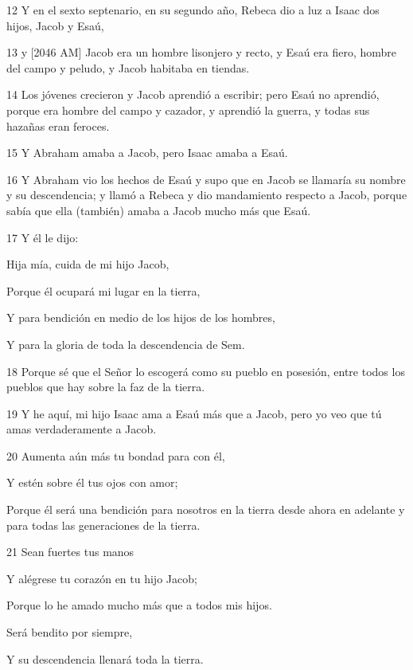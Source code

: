 \par 12 Y en el sexto septenario, en su segundo año, Rebeca dio a luz a Isaac dos hijos, Jacob y Esaú,
\par 13 y [2046 AM] Jacob era un hombre lisonjero y recto, y Esaú era fiero, hombre del campo y peludo, y Jacob habitaba en tiendas.
\par 14 Los jóvenes crecieron y Jacob aprendió a escribir; pero Esaú no aprendió, porque era hombre del campo y cazador, y aprendió la guerra, y todas sus hazañas eran feroces.
\par 15 Y Abraham amaba a Jacob, pero Isaac amaba a Esaú.
\par 16 Y Abraham vio los hechos de Esaú y supo que en Jacob se llamaría su nombre y su descendencia; y llamó a Rebeca y dio mandamiento respecto a Jacob, porque sabía que ella (también) amaba a Jacob mucho más que Esaú.
\par 17 Y él le dijo:
\par    
\par     Hija mía, cuida de mi hijo Jacob,  
\par     Porque él ocupará mi lugar en la tierra,  
\par     Y para bendición en medio de los hijos de los hombres,  
\par     Y para la gloria de toda la descendencia de Sem.
\par    
\par 18 Porque sé que el Señor lo escogerá como su pueblo en posesión, entre todos los pueblos que hay sobre la faz de la tierra.
\par 19 Y he aquí, mi hijo Isaac ama a Esaú más que a Jacob, pero yo veo que tú amas verdaderamente a Jacob.
\par    
\par 20 Aumenta aún más tu bondad para con él,  
\par     Y estén sobre él tus ojos con amor;  
\par     Porque él será una bendición para nosotros en la tierra desde ahora en adelante y para todas las generaciones de la tierra.
\par    
\par 21 Sean fuertes tus manos  
\par     Y alégrese tu corazón en tu hijo Jacob;  
\par     Porque lo he amado mucho más que a todos mis hijos.
\par    
\par     Será bendito por siempre,  
\par     Y su descendencia llenará toda la tierra.
